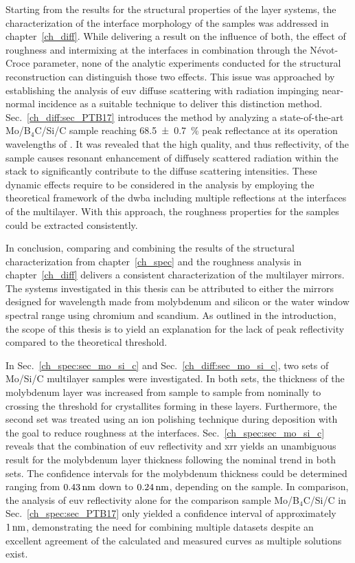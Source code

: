 Starting from the results for the structural properties of the layer systems, the characterization of the interface morphology of the samples was addressed in chapter~\ref{ch_diff}. While delivering a result on the influence of both, the effect of roughness and intermixing at the interfaces in combination through the N{\'e}vot-Croce parameter, none of the analytic experiments conducted for the structural reconstruction can distinguish those two effects. This issue was approached by establishing the analysis of \gls{euv} diffuse scattering with radiation impinging near-normal incidence as a suitable technique to deliver this distinction method. Sec.~\ref{ch_diff:sec_PTB17} introduces the method by analyzing a state-of-the-art Mo/B$_4$C/Si/C sample reaching \SI{68.5 \pm 0.7}{\percent} peak reflectance at its operation wavelengths of . It was revealed that the high quality, and thus reflectivity, of the sample causes resonant enhancement of diffusely scattered radiation within the stack to significantly contribute to the diffuse scattering intensities. These dynamic effects require to be considered in the analysis by employing the theoretical framework of the \glsdesc{dwba} including multiple reflections at the interfaces of the multilayer. With this approach, the roughness properties for the samples could be extracted consistently.

In conclusion, comparing and combining the results of the structural characterization from chapter~\ref{ch_spec} and the roughness analysis in chapter~\ref{ch_diff} delivers a consistent characterization of the multilayer mirrors. The systems investigated in this thesis can be attributed to either the mirrors designed for  wavelength made from molybdenum and silicon or the water window spectral range using chromium and scandium. As outlined in the introduction, the scope of this thesis is to yield an explanation for the lack of peak reflectivity compared to the theoretical threshold.

In Sec.~\ref{ch_spec:sec_mo_si_c} and Sec.~\ref{ch_diff:sec_mo_si_c}, two sets of Mo/Si/C multilayer samples were investigated. In both sets, the thickness of the molybdenum layer was increased from sample to sample from nominally  to  crossing the threshold for crystallites forming in these layers. Furthermore, the second set was treated using an ion polishing technique during deposition with the goal to reduce roughness at the interfaces. Sec.~\ref{ch_spec:sec_mo_si_c} reveals that the combination of \gls{euv} reflectivity and \glsdesc{xrr} yields an unambiguous result for the molybdenum layer thickness following the nominal trend in both sets. The confidence intervals for the molybdenum thickness could be determined ranging from $\nm{0.43}$ down to $\nm{0.24}$, depending on the sample. In comparison, the analysis of \gls{euv} reflectivity alone for the comparison sample Mo/B$_4$C/Si/C in Sec.~\ref{ch_spec:sec_PTB17} only yielded a confidence interval of approximately $\nm{1}$, demonstrating the need for combining multiple datasets despite an excellent agreement of the calculated and measured curves as multiple solutions exist.

